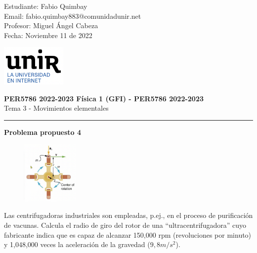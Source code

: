 \documentclass[11pt,letterpaper]{article}
\begin{document}
\pagestyle{plain}

\begin{flushleft}
Estudiante: Fabio Quimbay\\
Email: fabio.quimbay883@comunidadunir.net\\
Profesor: Miguel Ángel Cabeza\\
Fecha: Noviembre 11 de 2022\\
\end{flushleft}

\begin{flushright}\vspace{-20mm}
\includegraphics[height=2cm]{logo.png}
\end{flushright}
 
\begin{center}\vspace{0cm}
\textbf{\large PER5786 2022-2023  Física 1 (GFI) - PER5786 2022-2023}\\
 Tema 3 - Movimientos elementales
\end{center}

 
\rule{\linewidth}{0.1mm}

\bigskip
\bigskip

\textbf{Problema propuesto 4}\\

\begin{figure}
\begin{center}
\includegraphics[width=0.25\textwidth]{problema_4.png}
\end{center}
\end{figure}

Las centrifugadoras industriales son empleadas, p.ej., en el proceso de purificación de vacunas. Calcula el radio de giro del rotor de una “ultracentrifugadora” cuyo fabricante indica que es capaz de alcanzar 150,000 rpm (revoluciones por minuto) y 1,048,000 veces la aceleración de la gravedad ($9,8 m/s^2$).\\
\end{document}
